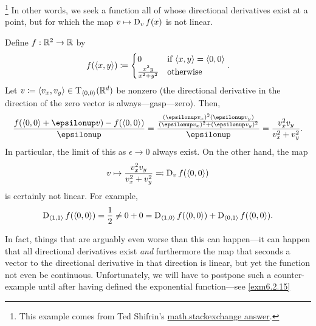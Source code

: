 \begin{exm}\footnote{This example comes from Ted Shifrin's \href{http://math.stackexchange.com/questions/694486/show-that-the-directional-derivative-is-linear-by-definition}{math.stackexchange answer}.}\label{exm6.2.10}
In other words, we seek a function all of whose directional derivatives exist at a point, but for which the map $v\mapsto \D _vf(x)$ is not linear.

Define $f:\R ^2\rightarrow \R$ by
\begin{equation}
f(\coord{x,y})\coloneqq \begin{cases}0 & \text{if }\coord{x,y}=\coord{0,0} \\ \frac{x^2y}{x^2+y^2} & \text{otherwise}\end{cases}.
\end{equation}
Let $v\coloneqq \coord{v_x,v_y}\in \tangent{\R ^d}{\coord{0,0}}$ be nonzero (the directional derivative in the direction of the zero vector is always---gasp---zero).  Then,
\begin{equation}
\frac{f(\coord{0,0}+\epsilon v)-f(\coord{0,0})}{\epsilon}=\frac{\frac{(\epsilon v_x)^2(\epsilon v_y)}{(\epsilon v_x)^2+(\epsilon v_y)^2}}{\epsilon}=\frac{v_x^2v_y}{v_x^2+v_y^2}.
\end{equation}
In particular, the limit of this as $\epsilon \to 0$ always exist.  On the other hand, the map
\begin{equation}
v\mapsto \frac{v_x^2v_y}{v_x^2+v_y^2}\eqqcolon \D _vf(\coord{0,0})
\end{equation}
is certainly not linear.  For example,
\begin{equation}
\D _{\coord{1,1}}f(\coord{0,0})=\frac{1}{2}\neq 0+0=\D _{\coord{1,0}}f(\coord{0,0})+\D _{\coord{0,1}}f(\coord{0,0}).
\end{equation}
\end{exm}
In fact, things that are arguably even worse than this can happen---it can happen that all directional derivatives exist \emph{and} furthermore the map that seconds a vector to the directional derivative in that direction is linear, but yet the function not even be continuous.  Unfortunately, we will have to postpone such a counter-example until after having defined the exponential function---see \cref{exm6.2.15}

